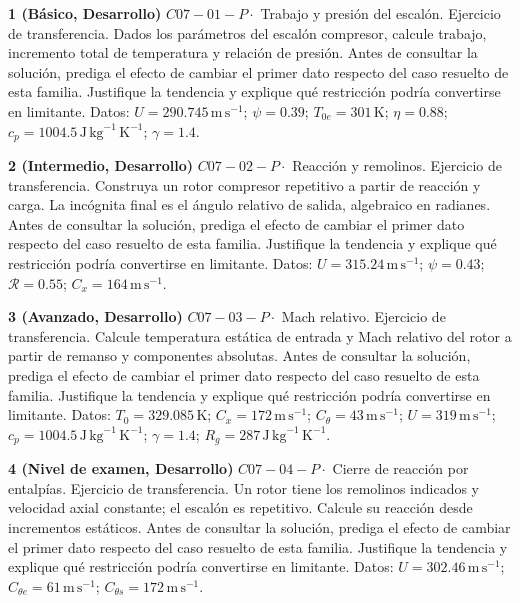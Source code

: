 \documentclass[10pt,openany]{book}
\begin{document}
\begin{tcolorbox}[title={Ejercicios propuestos}, studiumworked, breakable]

\noindent\textbf{1 (Básico, Desarrollo)}
\(C07-01-P \cdot\) Trabajo y presión del escalón. Ejercicio de transferencia. Dados los parámetros del escalón compresor, calcule trabajo, incremento total de temperatura y relación de presión. Antes de consultar la solución, prediga el efecto de cambiar el primer dato respecto del caso resuelto de esta familia. Justifique la tendencia y explique qué restricción podría convertirse en limitante. Datos: \(U=290.745\, \mathrm{m}\,\mathrm{s}^{-1}\); \(\psi=0.39\); \(T_{0e}=301\, \mathrm{K}\); \(\eta=0.88\); \(c_p=1004.5\, \mathrm{J}\,\mathrm{kg}^{-1}\,\mathrm{K}^{-1}\); \(\gamma=1.4\).

\noindent\textbf{2 (Intermedio, Desarrollo)}
\(C07-02-P \cdot\) Reacción y remolinos. Ejercicio de transferencia. Construya un rotor compresor repetitivo a partir de reacción y carga. La incógnita final es el ángulo relativo de salida, algebraico en radianes. Antes de consultar la solución, prediga el efecto de cambiar el primer dato respecto del caso resuelto de esta familia. Justifique la tendencia y explique qué restricción podría convertirse en limitante. Datos: \(U=315.24\, \mathrm{m}\,\mathrm{s}^{-1}\); \(\psi=0.43\); \(\mathcal R=0.55\); \(C_x=164\, \mathrm{m}\,\mathrm{s}^{-1}\).

\noindent\textbf{3 (Avanzado, Desarrollo)}
\(C07-03-P \cdot\) Mach relativo. Ejercicio de transferencia. Calcule temperatura estática de entrada y Mach relativo del rotor a partir de remanso y componentes absolutas. Antes de consultar la solución, prediga el efecto de cambiar el primer dato respecto del caso resuelto de esta familia. Justifique la tendencia y explique qué restricción podría convertirse en limitante. Datos: \(T_0=329.085\, \mathrm{K}\); \(C_x=172\, \mathrm{m}\,\mathrm{s}^{-1}\); \(C_\theta=43\, \mathrm{m}\,\mathrm{s}^{-1}\); \(U=319\, \mathrm{m}\,\mathrm{s}^{-1}\); \(c_p=1004.5\, \mathrm{J}\,\mathrm{kg}^{-1}\,\mathrm{K}^{-1}\); \(\gamma=1.4\); \(R_g=287\, \mathrm{J}\,\mathrm{kg}^{-1}\,\mathrm{K}^{-1}\).

\noindent\textbf{4 (Nivel de examen, Desarrollo)}
\(C07-04-P \cdot\) Cierre de reacción por entalpías. Ejercicio de transferencia. Un rotor tiene los remolinos indicados y velocidad axial constante; el escalón es repetitivo. Calcule su reacción desde incrementos estáticos. Antes de consultar la solución, prediga el efecto de cambiar el primer dato respecto del caso resuelto de esta familia. Justifique la tendencia y explique qué restricción podría convertirse en limitante. Datos: \(U=302.46\, \mathrm{m}\,\mathrm{s}^{-1}\); \(C_{\theta e}=61\, \mathrm{m}\,\mathrm{s}^{-1}\); \(C_{\theta s}=172\, \mathrm{m}\,\mathrm{s}^{-1}\).
\end{tcolorbox}
\end{document}
